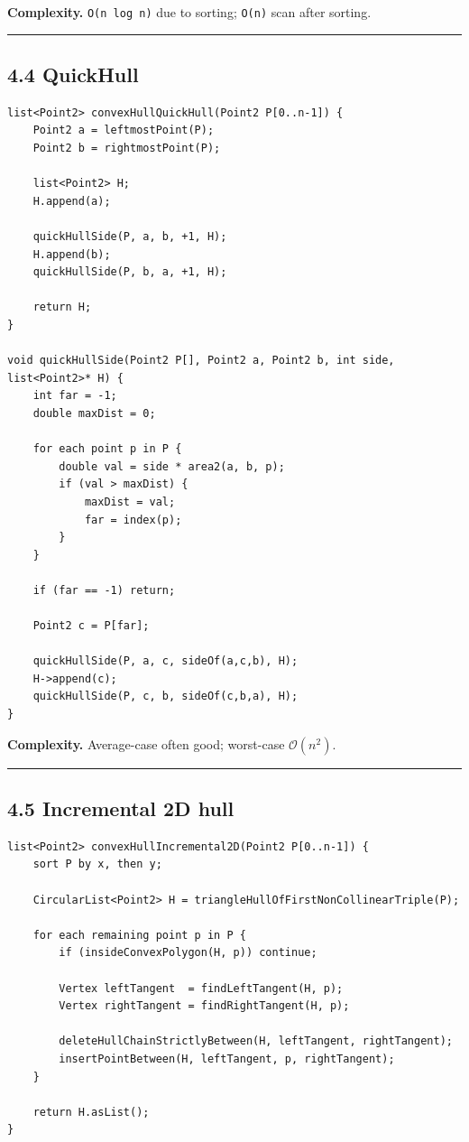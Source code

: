 \documentclass[11pt]{article}
\begin{document}
\textbf{Complexity.} \texttt{O(n log n)} due to
sorting; \texttt{O(n)} scan after sorting.

\begin{center}\rule{0.5\linewidth}{0.5pt}\end{center}

\subsection{4.4 QuickHull}\label{quickhull}

\begin{verbatim}
list<Point2> convexHullQuickHull(Point2 P[0..n-1]) {
    Point2 a = leftmostPoint(P);
    Point2 b = rightmostPoint(P);

    list<Point2> H;
    H.append(a);

    quickHullSide(P, a, b, +1, H);
    H.append(b);
    quickHullSide(P, b, a, +1, H);

    return H;
}

void quickHullSide(Point2 P[], Point2 a, Point2 b, int side, list<Point2>* H) {
    int far = -1;
    double maxDist = 0;

    for each point p in P {
        double val = side * area2(a, b, p);
        if (val > maxDist) {
            maxDist = val;
            far = index(p);
        }
    }

    if (far == -1) return;

    Point2 c = P[far];

    quickHullSide(P, a, c, sideOf(a,c,b), H);
    H->append(c);
    quickHullSide(P, c, b, sideOf(c,b,a), H);
}
\end{verbatim}

\textbf{Complexity.} Average-case often good; worst-case
\(\mathcal{O}(n^2)\).

\begin{center}\rule{0.5\linewidth}{0.5pt}\end{center}

\subsection{4.5 Incremental 2D hull}\label{incremental-2d-hull}

\begin{verbatim}
list<Point2> convexHullIncremental2D(Point2 P[0..n-1]) {
    sort P by x, then y;

    CircularList<Point2> H = triangleHullOfFirstNonCollinearTriple(P);

    for each remaining point p in P {
        if (insideConvexPolygon(H, p)) continue;

        Vertex leftTangent  = findLeftTangent(H, p);
        Vertex rightTangent = findRightTangent(H, p);

        deleteHullChainStrictlyBetween(H, leftTangent, rightTangent);
        insertPointBetween(H, leftTangent, p, rightTangent);
    }

    return H.asList();
}
\end{verbatim}
\end{document}
